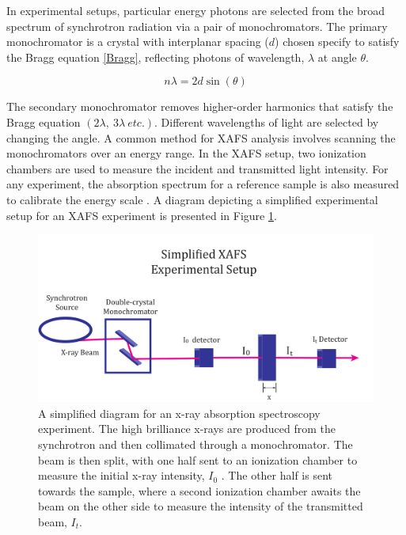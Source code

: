 In experimental setups, particular energy photons are selected from the broad spectrum of synchrotron radiation via a pair of monochromators. The primary monochromator is a crystal with interplanar spacing ($ d $) chosen specify to satisfy the Bragg equation \ref{Bragg}, reflecting photons of wavelength, $ \lambda $ at angle $ \theta $.  

\begin{equation}
    \label{Bragg}
    n\lambda = 2d\sin(\theta)
\end{equation}

The secondary monochromator removes higher-order harmonics that satisfy the Bragg equation $ (2\lambda,~3\lambda~etc.). $ Different wavelengths of light are selected by changing the angle. A common method for XAFS analysis involves scanning the monochromators over an energy range. In the XAFS setup, two ionization chambers are used to measure the incident and transmitted light intensity. For any experiment, the absorption spectrum for a reference sample is also measured to calibrate the energy scale \cite{exafsxanes1988}. A diagram depicting a simplified experimental setup for an XAFS experiment is presented in Figure \ref{fig:xafs-setup}.  

\begin{figure}[h]
    \centering
    \includegraphics[width=\linewidth]{Chapters/Figures/synchrotron-diagram.pdf}
    \caption[Example XAFS Experiment Setup]{A simplified diagram for an x-ray absorption spectroscopy experiment. The high brilliance x-rays are produced from the synchrotron and then collimated through a monochromator. The beam is then split, with one half sent to an ionization chamber to measure the initial x-ray intensity, $ I_0 $ . The other half is sent towards the sample, where a second ionization chamber awaits the beam on the other side to measure the intensity of the transmitted beam, $ I_t $.}
    \label{fig:xafs-setup}
\end{figure}

